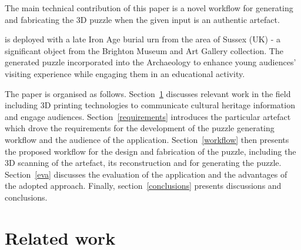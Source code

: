 \documentclass[acmlarge,screen,dvipsnames]{acmart}
\begin{document}
The main technical contribution of this paper is a novel workflow for generating
and fabricating the 3D puzzle when the given input is an
authentic  artefact. 

 


 is deployed with a late Iron Age burial urn
from the area of Sussex (UK) - a significant object from the Brighton
Museum and Art Gallery collection. The generated puzzle 
incorporated into the Archaeology  to enhance young audiences' visiting experience while
engaging them in an educational activity.



The paper is organised as follows. Section~\ref{related} discusses
relevant work in the field including 3D printing technologies to
communicate cultural heritage information and engage
audiences. Section~\ref{requirements} introduces the particular
artefact which drove the requirements for the development of the
puzzle generating workflow and the audience of the
application. Section~\ref{workflow} then presents the proposed
workflow for the design and fabrication of the puzzle, including the
3D scanning of the artefact, its reconstruction and  for
generating the puzzle.  Section~\ref{eva} discusses the evaluation
of the application and the advantages of the adopted
approach. Finally,
section~\ref{conclusions} presents discussions and conclusions.

\section{Related work}
\label{related}
\end{document}
